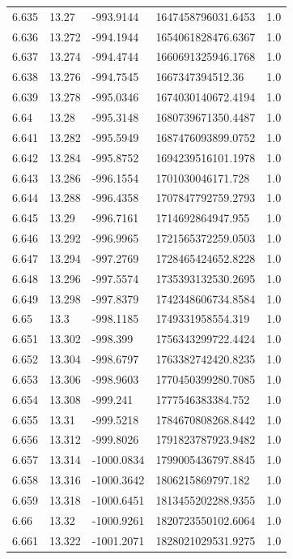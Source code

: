 \begin{tabular}{lllll}
6.635 & 13.27 & -993.9144 & 1647458796031.6453 & 1.0 \\
6.636 & 13.272 & -994.1944 & 1654061828476.6367 & 1.0 \\
6.637 & 13.274 & -994.4744 & 1660691325946.1768 & 1.0 \\
6.638 & 13.276 & -994.7545 & 1667347394512.36 & 1.0 \\
6.639 & 13.278 & -995.0346 & 1674030140672.4194 & 1.0 \\
6.64 & 13.28 & -995.3148 & 1680739671350.4487 & 1.0 \\
6.641 & 13.282 & -995.5949 & 1687476093899.0752 & 1.0 \\
6.642 & 13.284 & -995.8752 & 1694239516101.1978 & 1.0 \\
6.643 & 13.286 & -996.1554 & 1701030046171.728 & 1.0 \\
6.644 & 13.288 & -996.4358 & 1707847792759.2793 & 1.0 \\
6.645 & 13.29 & -996.7161 & 1714692864947.955 & 1.0 \\
6.646 & 13.292 & -996.9965 & 1721565372259.0503 & 1.0 \\
6.647 & 13.294 & -997.2769 & 1728465424652.8228 & 1.0 \\
6.648 & 13.296 & -997.5574 & 1735393132530.2695 & 1.0 \\
6.649 & 13.298 & -997.8379 & 1742348606734.8584 & 1.0 \\
6.65 & 13.3 & -998.1185 & 1749331958554.319 & 1.0 \\
6.651 & 13.302 & -998.399 & 1756343299722.4424 & 1.0 \\
6.652 & 13.304 & -998.6797 & 1763382742420.8235 & 1.0 \\
6.653 & 13.306 & -998.9603 & 1770450399280.7085 & 1.0 \\
6.654 & 13.308 & -999.241 & 1777546383384.752 & 1.0 \\
6.655 & 13.31 & -999.5218 & 1784670808268.8442 & 1.0 \\
6.656 & 13.312 & -999.8026 & 1791823787923.9482 & 1.0 \\
6.657 & 13.314 & -1000.0834 & 1799005436797.8845 & 1.0 \\
6.658 & 13.316 & -1000.3642 & 1806215869797.182 & 1.0 \\
6.659 & 13.318 & -1000.6451 & 1813455202288.9355 & 1.0 \\
6.66 & 13.32 & -1000.9261 & 1820723550102.6064 & 1.0 \\
6.661 & 13.322 & -1001.2071 & 1828021029531.9275 & 1.0 \\

\end{tabular}
